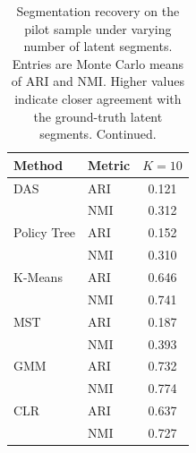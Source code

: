 \begin{table}[htbp]
\centering
\caption{Segmentation recovery on the pilot sample under varying number of latent segments. Entries are Monte Carlo means of ARI and NMI. Higher values indicate closer agreement with the ground-truth latent segments. Continued.}
\label{tab:app-ari-nmi-varying-K-cont}
\begin{tabular}{llc}
\toprule
Method & Metric & $K=10$ \\
\midrule
DAS & ARI & 0.121 \\
 & NMI & 0.312 \\
\addlinespace
Policy Tree & ARI & 0.152 \\
 & NMI & 0.310 \\
\addlinespace
K-Means & ARI & 0.646 \\
 & NMI & 0.741 \\
\addlinespace
MST & ARI & 0.187 \\
 & NMI & 0.393 \\
\addlinespace
GMM & ARI & 0.732 \\
 & NMI & 0.774 \\
\addlinespace
CLR & ARI & 0.637 \\
 & NMI & 0.727 \\
\bottomrule
\end{tabular}
\end{table}
